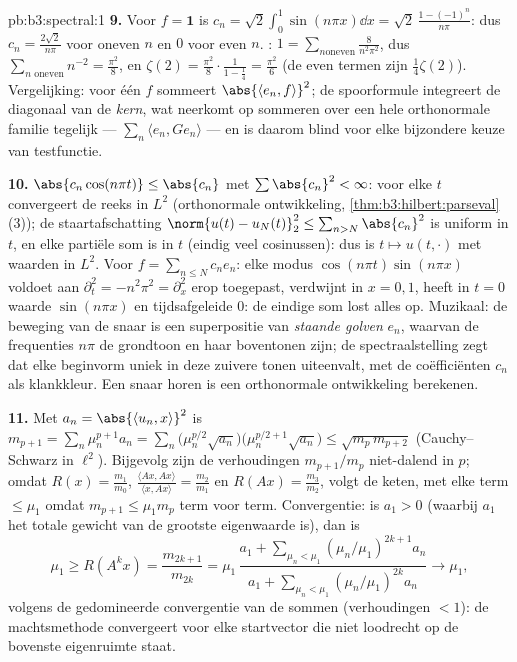 \begin{solution}{pb:b3:spectral:1}
\textbf{9.} Voor $f = \mathbf 1$ is $c_n =
\sqrt2\int_0^1\sin(n\pi x)\dd x = \sqrt2\,\frac{1 -
(-1)^n}{n\pi}$: dus $c_n = \frac{2\sqrt2}{n\pi}$ voor oneven $n$
en $0$ voor even $n$. : $1 = \sum_{n\text{
oneven}}\frac{8}{n^2\pi^2}$, dus $\sum_{n\text{ oneven}}n^{-2} =
\frac{\pi^2}8$, en $\zeta(2) = \frac{\pi^2}8\cdot\frac{1}{1 -
\frac14} = \frac{\pi^2}6$ (de even termen zijn
$\frac14\zeta(2)$). Vergelijking:  voor één $f$ sommeert
$\abs{\langle e_n, f\rangle}^2$; de spoorformule integreert de
diagonaal van de \emph{kern}, wat neerkomt op  sommeren
over een hele orthonormale familie tegelijk ---
$\sum_n\langle e_n, Ge_n\rangle$ --- en is daarom blind voor elke
bijzondere keuze van testfunctie.

\textbf{10.} $\abs{c_n\cos(n\pi t)} \leq \abs{c_n}$ met
$\sum\abs{c_n}^2 < \infty$: voor elke $t$ convergeert de reeks in
$L^2$ (orthonormale ontwikkeling,
\cref{thm:b3:hilbert:parseval}(3)); de staartafschatting
$\norm{u(t) - u_N(t)}_2^2 \leq \sum_{n>N}\abs{c_n}^2$ is uniform
in $t$, en elke partiële som is  in $t$ (eindig veel
cosinussen): dus is $t \mapsto u(t,\cdot)$  met waarden in
$L^2$. Voor $f = \sum_{n\leq N}c_ne_n$: elke modus $\cos(n\pi
t)\sin(n\pi x)$ voldoet aan $\partial_t^2 = -n^2\pi^2 =
\partial_x^2$ erop toegepast, verdwijnt in $x = 0, 1$, heeft in
$t = 0$ waarde $\sin(n\pi x)$ en tijdsafgeleide $0$: de eindige
som lost alles op. Muzikaal: de beweging van de snaar is een
superpositie van \emph{staande golven} $e_n$, waarvan de
frequenties $n\pi$ de grondtoon en haar boventonen zijn; de
spectraalstelling zegt dat elke beginvorm uniek in deze zuivere
tonen uiteenvalt, met de coëfficiënten $c_n$ als klankkleur. Een
snaar horen is een orthonormale ontwikkeling berekenen.

\textbf{11.} Met $a_n = \abs{\langle u_n, x\rangle}^2$ is
$m_{p+1} = \sum_n\mu_n^{p+1}a_n = \sum_n\bigl(\mu_n^{p/2}
\sqrt{a_n}\bigr)\bigl(\mu_n^{p/2+1}\sqrt{a_n}\bigr) \leq
\sqrt{m_p\,m_{p+2}}$ (Cauchy--Schwarz in $\ell^2$). Bijgevolg
zijn de verhoudingen $m_{p+1}/m_p$ niet-dalend in $p$; omdat
$R(x) = \frac{m_1}{m_0}$, $\frac{\langle Ax, Ax\rangle} {\langle
x, Ax\rangle} = \frac{m_2}{m_1}$ en $R(Ax) = \frac{m_3}{m_2}$,
volgt de keten, met elke term $\leq \mu_1$ omdat $m_{p+1} \leq
\mu_1m_p$ term voor term. Convergentie: is $a_1 > 0$ (waarbij
$a_1$ het totale gewicht van de grootste eigenwaarde is), dan is
\[
\mu_1 \geq R(A^kx) = \frac{m_{2k+1}}{m_{2k}} =
\mu_1\,\frac{a_1 + \sum_{\mu_n<\mu_1}(\mu_n/\mu_1)^{2k+1}
a_n}{a_1 + \sum_{\mu_n<\mu_1}(\mu_n/\mu_1)^{2k}a_n}
\longrightarrow \mu_1,
\]
volgens de gedomineerde convergentie van de sommen (verhoudingen
$< 1$): de machtsmethode convergeert voor elke startvector die
niet loodrecht op de bovenste eigenruimte staat.


\end{solution}
